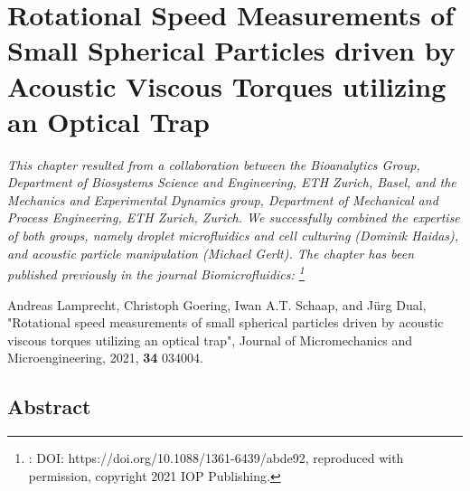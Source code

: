 \renewcommand{\relPath}{SECTION/50_Viscous_Torque}
 
\chapter[Rotation Measurement of Particles with an Optial Tweezer]{Rotational 
Speed Measurements of Small Spherical Particles driven by Acoustic Viscous 
Torques utilizing an Optical Trap}\label{ch:viscoustorque}
\textit{This chapter resulted from a collaboration between the Bioanalytics 
  Group, Department of Biosystems Science and Engineering, ETH Zurich, Basel, 
  and the Mechanics and Experimental Dynamics group, Department of Mechanical 
  and Process Engineering, ETH Zurich, Zurich. We successfully combined the 
  expertise of both groups, namely droplet microfluidics and cell culturing 
  (Dominik Haidas), and acoustic particle manipulation (Michael Gerlt). The 
  chapter has been published previously in the journal Biomicrofluidics:
\footnote{: DOI: https://doi.org/10.1088/1361-6439/abde92, reproduced with 
permission, copyright 2021 IOP Publishing.}}

\vspace{5mm} \noindent
Andreas Lamprecht, Christoph Goering, Iwan A.T. Schaap, and Jürg Dual,
"Rotational speed measurements of small spherical particles driven by acoustic 
viscous torques utilizing an optical trap", Journal of Micromechanics and 
Microengineering, 2021, \textbf{34} 034004.


\section{Abstract}






